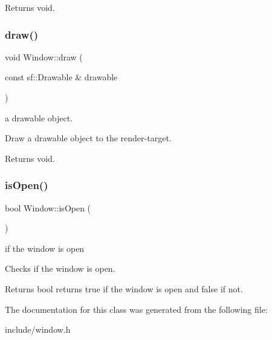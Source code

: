 \begin{DoxyReturn}{Returns}
void. 
\end{DoxyReturn}
\mbox{\label{class_window_adfb2d5826942693e289d13f314a341f7}} 
\subsubsection{\texorpdfstring{draw()}{draw()}}
{\footnotesize\ttfamily void Window\+::draw (\begin{DoxyParamCaption}\item[{const sf\+::\+Drawable \&}]{drawable }\end{DoxyParamCaption})}

a drawable object.

Draw a drawable object to the render-\/target.

\begin{DoxyReturn}{Returns}
void. 
\end{DoxyReturn}
\mbox{\label{class_window_a0530ead23b2c91ef90a5f98e4df41cb8}} 
\subsubsection{\texorpdfstring{is\+Open()}{isOpen()}}
{\footnotesize\ttfamily bool Window\+::is\+Open (\begin{DoxyParamCaption}{ }\end{DoxyParamCaption})}

if the window is open

Checks if the window is open.

\begin{DoxyReturn}{Returns}
bool returns true if the window is open and false if not. 
\end{DoxyReturn}


The documentation for this class was generated from the following file\+:\begin{DoxyCompactItemize}
\item 
include/window.\+h\end{DoxyCompactItemize}
